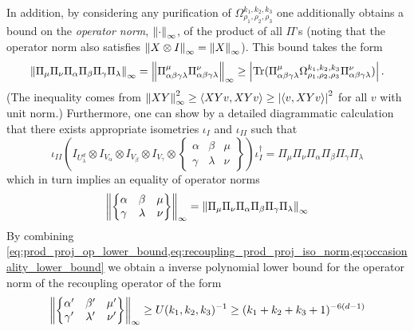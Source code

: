 \documentclass[notitlepage]{article}
\begin{document}
In addition, by considering any purification of $\Omega_{\rho_1,\rho_2,\rho_3}^{k_1, k_2, k_3}$ one additionally obtains a bound on the \textit{operator norm}, $\left\lVert\cdot\right\rVert_{\infty}$, of the product of all $\Pi$'s (noting that the operator norm also satisfies $\left\lVert X \otimes I\right\rVert_{\infty} = \left\lVert X\right\rVert_{\infty}$).
This bound takes the form
\begin{equation}
    \label{eq:prod_proj_op_lower_bound}
    \left\lVert\Pi_{\mu}\Pi_{\nu}\Pi_{\alpha}\Pi_{\beta}\Pi_{\gamma}\Pi_{\lambda}\right\rVert_{\infty} = \left\lVert\Pi^{\mu}_{\alpha\beta\gamma\lambda}\Pi^{\nu}_{\alpha\beta\gamma\lambda}\right\rVert_{\infty} \geq \left|\operatorname{Tr}(\Pi^{\mu}_{\alpha\beta\gamma\lambda} \Omega_{\rho_1,\rho_2,\rho_3}^{k_1, k_2, k_3} \Pi^{\nu}_{\alpha\beta\gamma\lambda})\right|.
\end{equation}
(The inequality comes from $\left\lVert XY\right\rVert_{\infty}^2 \geq \braket{XY v, XY v} \geq \left|\braket{v, XYv}\right|^{2}$ for all $v$ with unit norm.)
Furthermore, one can show by a detailed diagrammatic calculation that there exists appropriate isometries $\iota_{I}$ and $\iota_{II}$ such that
\begin{equation}
    \label{eq:recoupling_prod_proj_iso}
    \iota_{II} \left(I_{U^{d}_{\lambda}} \otimes I_{V_{\alpha}} \otimes I_{V_{\beta}} \otimes I_{V_{\gamma}} \otimes \begin{Bmatrix} \alpha & \beta & \mu \\ \gamma & \lambda & \nu \end{Bmatrix}\right) \iota_{I}^{\dagger} = \Pi_{\mu}\Pi_{\nu}\Pi_{\alpha}\Pi_{\beta}\Pi_{\gamma}\Pi_{\lambda}
\end{equation}
which in turn implies an equality of operator norms
\begin{equation}
    \label{eq:recoupling_prod_proj_iso_norm}
    \left\lVert\begin{Bmatrix} \alpha & \beta & \mu \\ \gamma & \lambda & \nu \end{Bmatrix}\right\rVert_{\infty} = \left\lVert\Pi_{\mu}\Pi_{\nu}\Pi_{\alpha}\Pi_{\beta}\Pi_{\gamma}\Pi_{\lambda}\right\rVert_{\infty}
\end{equation}
By combining \cref{eq:prod_proj_op_lower_bound,eq:recoupling_prod_proj_iso_norm,eq:occasionality_lower_bound} we obtain a inverse polynomial lower bound for the operator norm of the recoupling operator of the form
\begin{equation}
    \left\lVert\begin{Bmatrix} \alpha' & \beta' & \mu' \\ \gamma' & \lambda' & \nu' \end{Bmatrix}\right\rVert_{\infty}
    \geq U(k_1,k_2,k_3)^{-1} \geq (k_1+k_2+k_3+1)^{-6(d-1)}
\end{equation}
\end{document}
